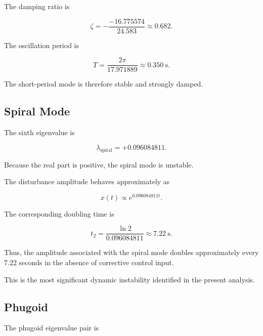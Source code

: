 \documentclass[11pt,a4paper]{article}
\begin{document}
The damping ratio is

\begin{equation}
\zeta
=
-\frac{-16.775574}{24.583}
\approx0.682.
\end{equation}

The oscillation period is

\begin{equation}
T=
\frac{2\pi}{17.971889}
\approx0.350~\mathrm{s}.
\end{equation}

The short-period mode is therefore stable and strongly damped.

\subsection{Spiral Mode}

The sixth eigenvalue is

\begin{equation}
\lambda_{\mathrm{spiral}}
=
+0.096084811.
\end{equation}

Because the real part is positive, the spiral mode is unstable.

The disturbance amplitude behaves approximately as

\begin{equation}
x(t)\propto
e^{0.096084811t}.
\end{equation}

The corresponding doubling time is

\begin{equation}
t_2
=
\frac{\ln2}{0.096084811}
\approx7.22~\mathrm{s}.
\end{equation}

Thus, the amplitude associated with the spiral mode doubles approximately
every $7.22$ seconds in the absence of corrective control input.

This is the most significant dynamic instability identified in the
present analysis.

\subsection{Phugoid}

The phugoid eigenvalue pair is
\end{document}
